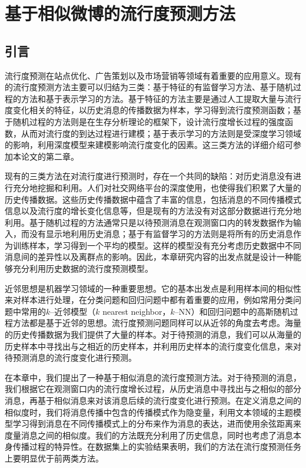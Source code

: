 \chapter{基于相似微博的流行度预测方法}
\label{chap:three}
\section{引言}
流行度预测在站点优化、广告策划以及市场营销等领域有着重要的应用意义。现有的流行度预测方法主要可以归结为三类：基于特征的有监督学习方法、基于随机过程的方法和基于表示学习的方法。基于特征的方法主要是通过人工提取大量与流行度变化相关的特征，以历史消息的传播数据为样本，学习得到流行度预测函数；基于随机过程的方法则是在生存分析理论的框架下，设计流行度增长过程的强度函数，从而对流行度的到达过程进行建模；基于表示学习的方法则是受深度学习领域的影响，利用深度模型来建模影响流行度变化的因素。这三类方法的详细介绍可参加本论文的第二章。

现有的三类方法在对流行度进行预测时，存在一个共同的缺陷：对历史消息没有进行充分地挖掘和利用。人们对社交网络平台的深度使用，也使得我们积累了大量的历史传播数据。这些历史传播数据中蕴含了丰富的信息，包括消息的不同传播模式信息以及流行度的增长变化信息等，但是现有的方法没有对这部分数据进行充分地利用。基于随机过程的方法通常只是以待预测消息在观测窗口内的转发数据作为输入，而没有显示地利用历史消息；基于有监督学习的方法则是将所有的历史消息作为训练样本，学习得到一个平均的模型。这样的模型没有充分考虑历史数据中不同消息间的差异性以及离群点的影响。因此，本章研究内容的出发点就是设计一种能够充分利用历史数据的流行度预测模型。

近邻思想是机器学习领域的一种重要思想。它的基本出发点是利用样本间的相似性来对样本进行处理，在分类问题和回归问题中都有着重要的应用，例如常用分类问题中常用的$k$--近邻模型\citep{keller1985fuzzy}（$k$ nearest neighbor，$k$--NN）和回归问题中的高斯随机过程方法\citep{williams1996gaussian}都是基于近邻的思想。流行度预测问题同样可以从近邻的角度去考虑。海量的历史传播数据为我们提供了大量的样本。对于待预测的消息，我们可以从海量的历史样本中寻找出与之相近的历史样本，并利用历史样本的流行度变化信息，来对待预测消息的流行度变化进行预测。

 在本章中，我们提出了一种基于相似消息的流行度预测方法。对于待预测的消息，我们根据它在观测窗口内的流行度增长过程，从历史消息中寻找出与之相似的部分消息，再基于相似消息来对该消息后续的流行度变化进行预测。在定义消息之间的相似度时，我们将消息传播中包含的传播模式作为隐变量，利用文本领域的主题模型\citep{blei2003latent}学习得到消息在不同传播模式上的分布来作为消息的表达，进而使用余弦距离来度量消息之间的相似度。我们的方法既充分利用了历史信息，同时也考虑了消息本身传播过程的特异性。在数据集上的实验结果表明，我们的方法在流行度预测任务上要明显优于前两类方法。

